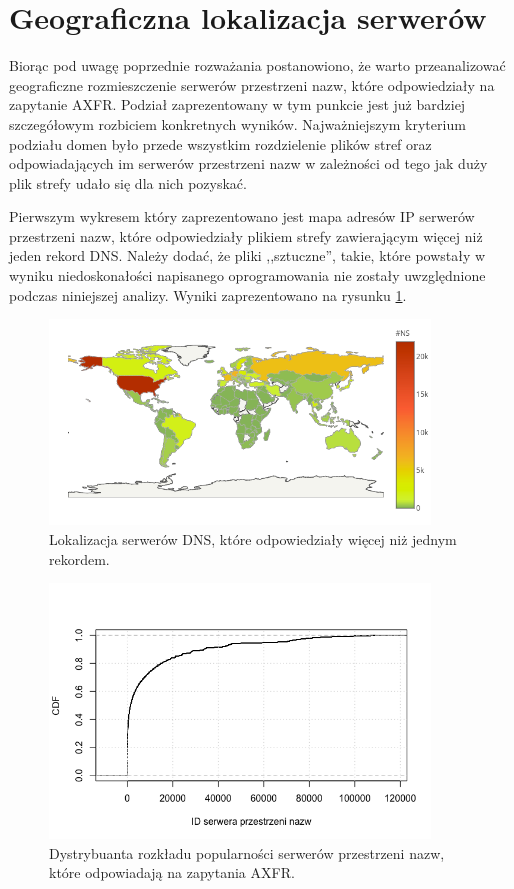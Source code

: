 \section{Geograficzna lokalizacja serwerów}
\noindent Biorąc pod uwagę poprzednie rozważania postanowiono, że warto przeanalizować geograficzne rozmieszczenie serwerów przestrzeni nazw,
które odpowiedziały na zapytanie AXFR. Podział zaprezentowany w tym punkcie jest już bardziej szczegółowym rozbiciem konkretnych
wyników. Najważniejszym kryterium podziału domen było przede wszystkim rozdzielenie plików stref oraz odpowiadających im serwerów
przestrzeni nazw w zależności od tego jak duży plik strefy udało się dla nich pozyskać.

Pierwszym wykresem który zaprezentowano jest mapa adresów IP serwerów przestrzeni nazw, które odpowiedziały plikiem strefy zawierającym
więcej niż jeden rekord DNS. Należy dodać, że pliki ,,sztuczne'', takie, które powstały w wyniku niedoskonałości napisanego oprogramowania
nie zostały uwzględnione podczas niniejszej analizy. Wyniki zaprezentowano na rysunku \ref{fig:many_lines_map}.

\begin{figure}[h!]
\centering
\includegraphics[width=0.9\textwidth]{image/many_lines_map_no_title}
\caption{Lokalizacja serwerów DNS, które odpowiedziały więcej niż jednym rekordem.}
\label{fig:many_lines_map}
\end{figure}

\begin{figure}[h!]
\centering
\includegraphics[width=0.9\textwidth]{image/cdf_ns_responded}
\caption{Dystrybuanta rozkładu popularności serwerów przestrzeni nazw, które odpowiadają na zapytania AXFR.}
\label{fig:cdf_ns}
\end{figure}

